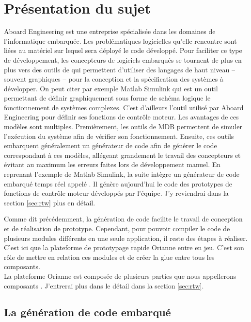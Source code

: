 \chapter{Présentation du sujet}
Aboard Engineering est une entreprise spécialisée dans les domaines de
l'informatique embarquée. Les problématiques logicielles qu'elle rencontre sont
liées au matériel sur lequel sera déployé le code développé. Pour faciliter ce
type de développement, les concepteurs de logiciels embarqués se tournent de
plus en plus vers des outils de  qui permettent d'utiliser des langages
de haut niveau -- souvent graphiques -- pour la conception et la spécification
des systèmes à développer. On peut citer par exemple Matlab\up{\circledR}
Simulink\up{\circledR} qui est un outil permettant de définir graphiquement sous
forme de schéma logique le fonctionnement de systèmes complexes. C'est
d'ailleurs l'outil utilisé par Aboard Engineering pour définir ses fonctions de
contrôle moteur. Les avantages de ces modèles sont multiples. Premièrement, les
outils de MDB permettent de simuler l'exécution du système afin de
vérifier son fonctionnement. Ensuite, ces outils embarquent généralement un
générateur de code afin de générer le code correspondant à ces modèles,
allégeant grandement le travail des concepteurs et évitant au maximum les
erreurs faites lors de développement \og manuel\fg{}. En reprenant l'exemple de
Matlab\up{\circledR} Simulink\up{\circledR}, la suite intègre un générateur de
code embarqué temps réel appelé . Il génère aujourd'hui le code des
prototypes de fonctions de contrôle moteur développés par l'équipe. J'y
reviendrai dans la section \ref{sec:rtw} plus en détail.

Comme dit précédemment, la génération de code facilite le travail de conception
et de réalisation de prototype. Cependant, pour pouvoir compiler le code de
plusieurs modules différents en une seule application, il reste des étapes à
réaliser. C'est ici que la plateforme de prototypage rapide Orianne
entre en jeu. C'est son rôle de mettre en relation ces modules et de créer la
\og glue \fg{} entre tous les composants.\\
La plateforme Orianne est composée de plusieurs parties que nous appellerons \og
composants \fg{}. J'entrerai plus dans le détail dans la section \ref{sec:rtw}.

\section{La génération de code embarqué}
